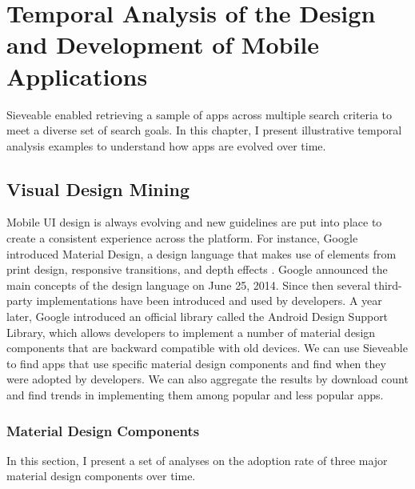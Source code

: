 \chapter{Temporal Analysis of the Design and Development of Mobile Applications}
\label{ch:findings_chapter}
Sieveable enabled retrieving a sample of apps across multiple search criteria to meet a diverse set of search goals.
In this chapter, I present illustrative temporal analysis examples to understand how apps are evolved over time.

\section{Visual Design Mining}

Mobile UI design is always evolving and new guidelines are put into place to create a consistent experience across the platform.
For instance, Google introduced Material Design, a design language that makes use of elements from print design, responsive transitions, and depth effects \cite{Google_Material_Design}.
Google announced the main concepts of the design language on June 25, 2014.
Since then several third-party implementations have been introduced and used by developers.
A year later, Google introduced an official library called the Android Design Support Library, which allows developers to implement a number of material design components that are backward compatible with old devices.
We can use Sieveable to find apps that use specific material design components and find when they were adopted by developers.
We can also aggregate the results by download count and find trends in implementing them among popular and less popular apps.

\subsection{Material Design Components}
In this section, I present a set of analyses on the adoption rate of three major material design components over time.

